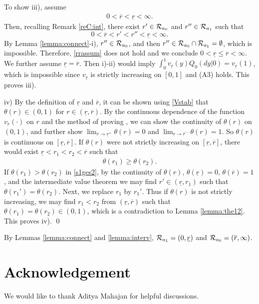 \documentclass[graybox]{svmult}
\begin{document}
To show iii),
 assume
\begin{align}
0< \overline r <\underline r < \infty.  \label{rrassum}
\end{align}
Then, recalling Remark \ref{reC:int}, there exist $r'\in {\cal R}_{a_0} $ and $r''\in {\cal R}_{a_1} $ such that
$$
0< \overline r<r'<r''<\underline r< \infty.
$$
By Lemma \ref{lemma:connect}-i), $r''\in {\cal  R}_{a_0}$, and
then $r''\in {\cal R}_{a_0}\cap {\cal  R}_{a_1}=\emptyset$, which is impossible. Therefore, \eqref{rrassum} does not hold and we conclude $0<\underline r\le \overline r<\infty$.
   We further assume $\underline r=\overline r$. Then
i)-ii) would imply
$\int_0^1  v_{\underline r}(y) Q_0(dy|0) = v_{\underline r}(1)$,
which is impossible since $v_{\underline r}$ is  strictly increasing
on $[0, 1]$ and (A3) holds. This proves iii).

iv) By the definition of $\underline r$ and $\overline r$, it can be shown using \eqref{Vstab} that
$\theta(r)\in (0, 1)$  for $r\in (\underline r, \overline r)$.
By the continuous dependence of the function $v_r(\cdot)$ on $r$ and the method of proving \cite[Lemma 10]{HM16Chen}, we can show  the continuity of $\theta(r)$ on $(0,1)$, and further show $\lim_{r\to \underline r^+}\theta(r)=0$ and $\lim_{r\to \overline{r}^-} \theta(r) =1$. So $\theta(r)$ is continuous on $[\underline r, \overline r]$.
If $\theta(r)$ were not strictly increasing on $[\underline r, \overline r]$,  there would exist
 $\underline r<r_1<r_2<\overline r$ such that
 \begin{align} \theta(r_1)\ge \theta(r_2). \label{s1ges2}
 \end{align}
  If $\theta (r_1)>\theta (r_2)$ in \eqref{s1ges2}, by the continuity of $\theta(r)$,
$\theta(\underline r)=0$, $\theta(\overline r)=1$, and the intermediate value theorem we may find $r'\in (\underline r, r_1)$ such that  $\theta( r_1')=\theta( r_2)$.
Next, we replace $r_1$ by $r_1'$.
Thus if $\theta(r)$ is not strictly increasing,  we may find $r_1<r_2$ from $(\underline r, \overline r)$ such that $\theta (r_1)=
\theta( r_2)\in (0, 1)$, which is a contradiction to Lemma \ref{lemma:the12}.
 This proves iv).
 \qed

\begin{remark}
By Lemmas \ref{lemma:connect} and \ref{lemma:interv},
${\cal R}_{a_1}= (0, \underline r)$ and
${\cal R}_{a_0}= (\overline r, \infty)$.
\end{remark}




\section*{Acknowledgement}
We would like to thank Aditya Mahajan for helpful discussions.





\end{document}
